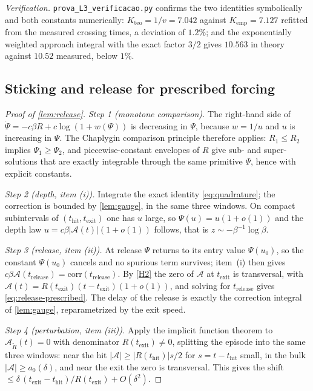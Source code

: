 \documentclass[11pt]{article}
\theoremstyle{definition}
\theoremstyle{remark}
\newcommand{\thit}{t_{\mathrm{hit}}}
\newcommand{\texit}{t_{\mathrm{exit}}}
\newcommand{\trel}{t_{\mathrm{release}}}
\newcommand{\Ar}{\mathcal{A}}                      %
\begin{document}
\noindent\emph{Verification.} \texttt{prova\_L3\_verificacao.py} confirms the two
identities symbolically and both constants numerically:
$K_{\mathrm{teo}}=1/v=7.042$ against $K_{\mathrm{emp}}=7.127$ refitted from the
measured crossing times, a deviation of $1.2\%$; and the exponentially weighted
approach integral with the exact factor $3/2$ gives $10.563$ in theory against
$10.52$ measured, below $1\%$.

\subsection{Sticking and release for prescribed forcing}\label{app:L4}

\begin{proof}[Proof of \cref{lem:release}]
\emph{Step 1 (monotone comparison).} The right-hand side of
$\dot\Psi=-c\beta R+c\log(1+w(\Psi))$ is decreasing in $\Psi$, because $w=1/u$
and $u$ is increasing in $\Psi$. The Chaplygin comparison principle therefore
applies: $R_1\le R_2$ implies $\Psi_1\ge\Psi_2$, and piecewise-constant envelopes
of $R$ give sub- and super-solutions that are exactly integrable through the same
primitive $\Psi$, hence with explicit constants.

\emph{Step 2 (depth, item (i)).} Integrate the exact identity
\eqref{eq:quadrature}; the correction is bounded by \cref{lem:gauge}, in the same
three windows. On compact subintervals of $(\thit,\texit)$ one has $u$ large, so
$\Psi(u)=u(1+o(1))$ and the depth law $u=c\beta|\Ar(t)|(1+o(1))$ follows, that is
$z\sim-\beta^{-1}\log\beta$.

\emph{Step 3 (release, item (ii)).} At release $\Psi$ returns to its entry value
$\Psi(u_0)$, so the constant $\Psi(u_0)$ cancels and no spurious term survives;
item~(i) then gives $c\beta\Ar(\trel)=\mathrm{corr}(\trel)$. By \eqref{H2} the
zero of $\Ar$ at $\texit$ is transversal, with
$\Ar(t)=R(\texit)(t-\texit)(1+o(1))$, and solving for $\trel$ gives
\eqref{eq:release-prescribed}. The delay of the release is exactly the correction
integral of \cref{lem:gauge}, reparametrized by the exit speed.

\emph{Step 4 (perturbation, item (iii)).} Apply the implicit function theorem to
$\Ar_{\tilde R}(t)=0$ with denominator $R(\texit)\ne0$, splitting the episode into
the same three windows: near the hit $|\Ar|\ge|R(\thit)|s/2$ for $s=t-\thit$
small, in the bulk $|\Ar|\ge a_0(\delta)$, and near the exit the zero is
transversal. This gives the shift
$\le\delta\,(\texit-\thit)/R(\texit)+O(\delta^{2})$.
\end{proof}
\end{document}
